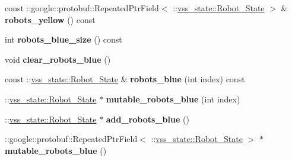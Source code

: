 \begin{DoxyCompactItemize}
\item 
const \+::google\+::protobuf\+::\+Repeated\+Ptr\+Field$<$ \+::\hyperlink{classvss__state_1_1Robot__State}{vss\+\_\+state\+::\+Robot\+\_\+\+State} $>$ \& {\bfseries robots\+\_\+yellow} () const \hypertarget{classvss__state_1_1Global__State_ad18fe89214728e2c808c8911575ab90b}{}\label{classvss__state_1_1Global__State_ad18fe89214728e2c808c8911575ab90b}

\item 
int {\bfseries robots\+\_\+blue\+\_\+size} () const \hypertarget{classvss__state_1_1Global__State_ab19e999740e3aa72946a92322bc7f163}{}\label{classvss__state_1_1Global__State_ab19e999740e3aa72946a92322bc7f163}

\item 
void {\bfseries clear\+\_\+robots\+\_\+blue} ()\hypertarget{classvss__state_1_1Global__State_ae88bcfb62ea5ea68673a48aaec873723}{}\label{classvss__state_1_1Global__State_ae88bcfb62ea5ea68673a48aaec873723}

\item 
const \+::\hyperlink{classvss__state_1_1Robot__State}{vss\+\_\+state\+::\+Robot\+\_\+\+State} \& {\bfseries robots\+\_\+blue} (int index) const \hypertarget{classvss__state_1_1Global__State_a92551a5a96b8585f89cc37c55b0c4e46}{}\label{classvss__state_1_1Global__State_a92551a5a96b8585f89cc37c55b0c4e46}

\item 
\+::\hyperlink{classvss__state_1_1Robot__State}{vss\+\_\+state\+::\+Robot\+\_\+\+State} $\ast$ {\bfseries mutable\+\_\+robots\+\_\+blue} (int index)\hypertarget{classvss__state_1_1Global__State_a1caf337906ddf4fa47b606dc76cd8a3b}{}\label{classvss__state_1_1Global__State_a1caf337906ddf4fa47b606dc76cd8a3b}

\item 
\+::\hyperlink{classvss__state_1_1Robot__State}{vss\+\_\+state\+::\+Robot\+\_\+\+State} $\ast$ {\bfseries add\+\_\+robots\+\_\+blue} ()\hypertarget{classvss__state_1_1Global__State_a3150ca6510afc0a88b10491642dff24a}{}\label{classvss__state_1_1Global__State_a3150ca6510afc0a88b10491642dff24a}

\item 
\+::google\+::protobuf\+::\+Repeated\+Ptr\+Field$<$ \+::\hyperlink{classvss__state_1_1Robot__State}{vss\+\_\+state\+::\+Robot\+\_\+\+State} $>$ $\ast$ {\bfseries mutable\+\_\+robots\+\_\+blue} ()\hypertarget{classvss__state_1_1Global__State_a73be200ff11edfc042221b579672d3b4}{}\label{classvss__state_1_1Global__State_a73be200ff11edfc042221b579672d3b4}


\end{DoxyCompactItemize}
